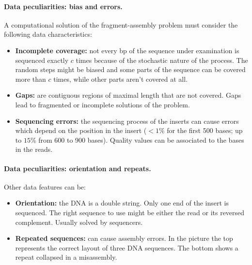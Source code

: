 \paragraph*{Data peculiarities: bias and errors.} A computational solution of the fragment-assembly problem must consider the following data characteristics:
\begin{itemize}
	\item \textbf{Incomplete coverage:} not every bp of the sequence under examination is sequenced exactly $c$ times because of the stochastic nature of the process. The random steps might be biased and some parts of the sequence can be covered more than $c$ times, while other parts aren't covered at all.
	\item \textbf{Gaps:} are contiguous regions of maximal length that are not covered. Gaps lead to fragmented or incomplete solutions of the problem.
	\item \textbf{Sequencing errors:} the sequencing process of the inserts can cause errors which depend on the position in the insert ($<1\%$ for the first 500 bases; up to $15\%$ from 600 to 900 bases). Quality values can be associated to the bases in the reads. 
\end{itemize}

\paragraph*{Data peculiarities: orientation and repeats.} Other data features can be:
\begin{itemize}
	\item \textbf{Orientation:} the DNA is a double string. Only one end of the insert is sequenced. The right sequence to use might be either the read or its reversed 
	complement. Usually solved by sequencers.
	\item \textbf{Repeated sequences:} can cause assembly errors. In the picture the top represents the correct layout of three DNA sequences. The bottom shows a repeat collapsed in a misassembly.
\end{itemize}

